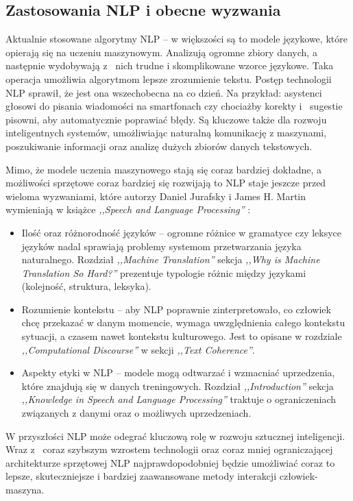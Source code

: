 \documentclass[wmii, inf, mgr]{uwmthesis}
\begin{document}
\subsection{Zastosowania NLP i obecne wyzwania}
Aktualnie stosowane algorytmy NLP -- w większości są to modele językowe, które opierają się na uczeniu maszynowym. Analizują ogromne zbiory danych, a następnie wydobywają z~ nich trudne i skomplikowane wzorce językowe. Taka operacja umożliwia algorytmom lepsze zrozumienie tekstu. Postęp technologii NLP sprawił, że jest ona wszechobecna na co dzień. Na przykład: asystenci głosowi do pisania wiadomości na smartfonach czy chociażby korekty i~ sugestie pisowni, aby automatycznie poprawiać błędy. Są kluczowe także dla rozwoju inteligentnych systemów, umożliwiając naturalną komunikację z maszynami, poszukiwanie informacji oraz analizę dużych zbiorów danych tekstowych.

Mimo, że modele uczenia maszynowego stają się coraz bardziej dokładne, a możliwości sprzętowe coraz bardziej się rozwijają to NLP staje jeszcze przed wieloma wyzwaniami, które autorzy Daniel Jurafsky i James H. Martin wymieniają w książce \textit{,,Speech and Language Processing''} \cite{SpeechandLanguageProcessing}:
\begin{itemize}
    \item {Ilość oraz różnorodność języków} -- ogromne różnice w gramatyce czy leksyce języków nadal sprawiają problemy systemom przetwarzania języka naturalnego. Rozdział \textit{,,Machine Translation''} \cite{SpeechandLanguageProcessing} sekcja \textit{,,Why is Machine Translation So Hard?''} prezentuje typologie różnic między językami (kolejność, struktura, leksyka).
    \item {Rozumienie kontekstu} -- aby NLP poprawnie zinterpretowało, co człowiek chcę przekazać w danym momencie, wymaga uwzględnienia całego kontekstu sytuacji, a czasem nawet kontekstu kulturowego. Jest to opisane w rozdziale \textit{,,Computational Discourse''} \cite{SpeechandLanguageProcessing} w sekcji \textit{,,Text Coherence''}.
    \item {Aspekty etyki w NLP} -- modele mogą odtwarzać i wzmacniać uprzedzenia, które znajdują się w danych treningowych. Rozdział \textit{,,Introduction''} \cite{SpeechandLanguageProcessing} sekcja \textit{,,Knowledge in Speech and Language Processing''} traktuje o ograniczeniach związanych z danymi oraz o możliwych uprzedzeniach.
\end{itemize}

W przyszłości NLP może odegrać kluczową rolę w rozwoju sztucznej inteligencji. Wraz z~ coraz szybszym wzrostem technologii oraz coraz mniej ograniczającej architekturze sprzętowej NLP najprawdopodobniej będzie umożliwiać coraz to lepsze, skuteczniejsze i bardziej zaawansowane metody interakcji człowiek-maszyna.
\end{document}
